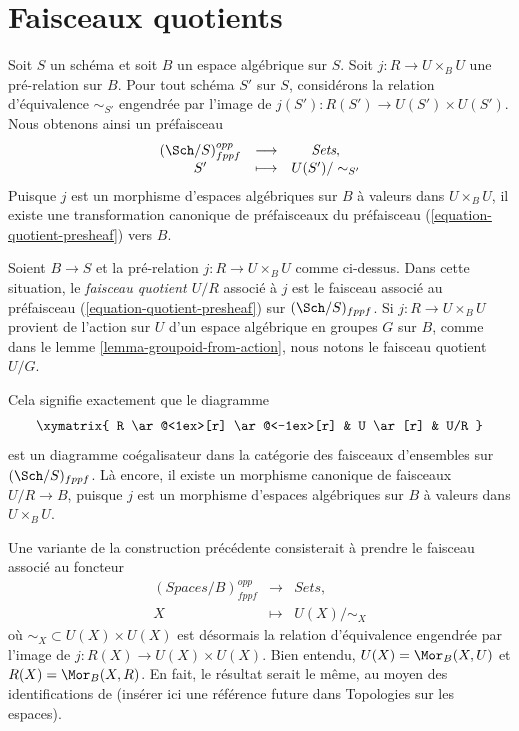 \section{Faisceaux quotients}
\label{section-quotient-sheaves}

\noindent
Soit $S$ un schéma et soit $B$ un espace algébrique sur $S$. Soit $j : R \to U \times_B U$ une pré-relation sur $B$. Pour tout schéma $S'$ sur $S$, considérons la relation d'équivalence $\sim_{S'}$ engendrée par l'image de $j(S') : R(S') \to U(S') \times U(S')$. Nous obtenons ainsi un préfaisceau
\begin{equation}
\label{equation-quotient-presheaf}
\begin{matrix}
(\Sch/S)^{opp}_{fppf} &
\longrightarrow &
\textit{Sets}, \\
S' &
\longmapsto  &
U(S')/\sim_{S'}
\end{matrix}
\end{equation}
Puisque $j$ est un morphisme d'espaces algébriques sur $B$ à valeurs dans $U \times_B U$, il existe une transformation canonique de préfaisceaux du préfaisceau (\ref{equation-quotient-presheaf}) vers $B$.

\begin{definition}
\label{definition-quotient-sheaf}
Soient $B \to S$ et la pré-relation $j : R \to U \times_B U$ comme ci-dessus. Dans cette situation, le {\it faisceau quotient $U/R$} associé à $j$ est le faisceau associé au préfaisceau (\ref{equation-quotient-presheaf}) sur $(\Sch/S)_{fppf}$. Si $j : R \to U \times_B U$ provient de l'action sur $U$ d'un espace algébrique en groupes $G$ sur $B$, comme dans le lemme \ref{lemma-groupoid-from-action}, nous notons le faisceau quotient $U/G$.
\end{definition}

\noindent
Cela signifie exactement que le diagramme
$$
\xymatrix{
R \ar@<1ex>[r] \ar@<-1ex>[r] &
U \ar[r] &
U/R
}
$$
est un diagramme coégalisateur dans la catégorie des faisceaux d'ensembles sur $(\Sch/S)_{fppf}$. Là encore, il existe un morphisme canonique de faisceaux $U/R \to B$, puisque $j$ est un morphisme d'espaces algébriques sur $B$ à valeurs dans $U \times_B U$.

\begin{remark}
\label{remark-quotient-variant}
Une variante de la construction précédente consisterait à prendre le faisceau associé au foncteur
$$
\begin{matrix}
(\textit{Spaces}/B)^{opp}_{fppf} &
\longrightarrow &
\textit{Sets}, \\
X &
\longmapsto  &
U(X)/\sim_X
\end{matrix}
$$
où $\sim_X \subset U(X) \times U(X)$ est désormais la relation d'équivalence engendrée par l'image de $j : R(X) \to U(X) \times U(X)$. Bien entendu, $U(X) = \Mor_B(X, U)$ et $R(X) = \Mor_B(X, R)$. En fait, le résultat serait le même, au moyen des identifications de (insérer ici une référence future dans Topologies sur les espaces).
\end{remark}

